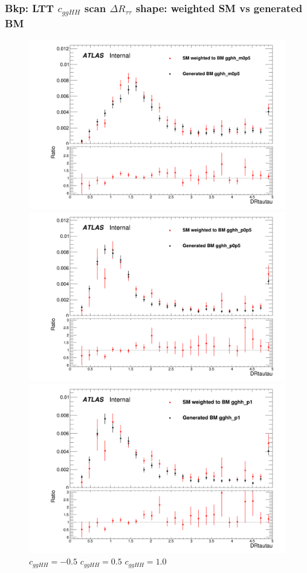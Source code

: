 \documentclass[twoside,11pt]{beamer}
\begin{document}
\begin{frame}
\frametitle{Bkp: LTT $c_{ggHH}$ scan $\Delta R_{\tau\tau}$ shape: weighted SM vs generated BM}

\begin{figure}
\includegraphics[width=.32\textwidth]{figures/Method_B_all_latest_LTT/BMgghh_m0p5h_DRtautau.png}
\includegraphics[width=.32\textwidth]{figures/Method_B_all_latest_LTT/BMgghh_p0p5h_DRtautau.png}
\includegraphics[width=.32\textwidth]{figures/Method_B_all_latest_LTT/BMgghh_p1h_DRtautau.png}
$c_{ggHH} = -0.5$ \hspace{5em} $c_{ggHH} = 0.5$\hspace{5em} $c_{ggHH} = 1.0$
\end{figure}


\end{frame}     
\end{document}
